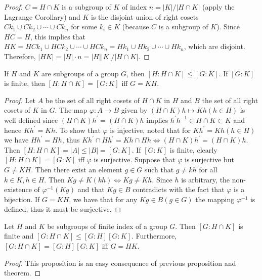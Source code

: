 \begin{proof}
	$ C = H \cap K $ is a subgroup of $ K $ of index $ n = |K|/|H \cap K|$ (apply the Lagrange Corollary) and $ K $ is the disjoint union of right cosets $ Ck_1 \cup C k_2 \cup \cdots \cup Ck_n $ for some $ k_i \in K $ (because $ C $ is a subgroup of $ K $). Since $ HC = H $, this implies that $ HK=HCk_1 \cup HCk_2 \cup \cdots \cup HCk_n =  Hk_1 \cup Hk_2 \cup \cdots \cup Hk_n$, which are disjoint. Therefore, $ |HK| = |H|\cdot n = |H||K|/|H \cap K| $.
\end{proof}
\begin{Proposition}
	If $ H $ and $ K $ are subgroups of a group $ G $, then $ [H:H\cap K]\leqslant [G:K] $. If $ [G:K] $ is finite, then $ [H:H\cap K]= [G:K]  $ iff $ G = KH $.
\end{Proposition}
\begin{proof}
	Let $ A $ be the set of all right cosets of $ H \cap K $ in $ H $ and $ B $ the set of all right cosets of $ K $ in $ G $. The map $ \varphi:A \to B $ given by $ (H \cap K)h \mapsto Kh(h \in H) $ is well defined since $ (H \cap K)h^\prime =  (H \cap K)h$ implies $ h^\prime h^{-1}\in H\cap K \subset K $ and hence $ Kh^\prime = Kh $. To show that $ \varphi $ is injective, noted that for $ Kh^\prime = Kh (h \in H) $ we have $ Hh^\prime = Hh $, thus $ Kh^\prime \cap Hh^\prime = Kh \cap Hh \Leftrightarrow (H \cap K)h^\prime = (H \cap K)h $. Then $ [H:H \cap K]=|A| \leqslant |B| = [G:K] $. If $ [G:K] $ is finite, clearly $ [H:H\cap K]=[G:K] $ iff $ \varphi $ is surjective. Suppose that $ \varphi $ is surjective but $ G \neq KH $. Then there exist an element $ g \in G $ such that $ g \neq kh $ for all $ k \in K, h \in H $. Then $ Kg \neq K(kh)\Leftrightarrow Kg \neq Kh $. Since $ h $ is arbitrary, the non-existence of $ \varphi^{-1}(Kg) $ and that $ Kg \in B $ contradicts with the fact that $ \varphi $ is a bijection. If $ G = KH $, we have that for any $ Kg \in B(g \in G) $ the mapping $ \varphi^{-1} $ is defined, thus it must be surjective.
\end{proof}
\begin{Proposition}
	Let $ H $ and $ K $ be subgroups of finite index of a group $ G $. Then $ [G:H\cap K] $ is finite and $ [G:H\cap K] \leqslant [G:H][G:K] $. Furthermore, $ [G:H\cap K] =[G:H][G:K]$ iff $ G=HK $.
\end{Proposition}
\begin{proof}
	This proposition is an easy consequence of previous proposition and theorem.
\end{proof}



